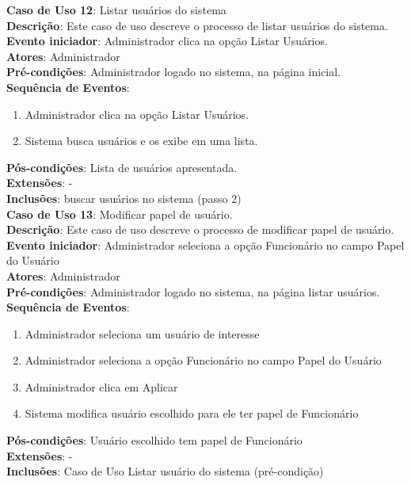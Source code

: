 \documentclass[]{politex}
\begin{document}
\noindent \textbf{Caso de Uso 12}: Listar usuários do sistema \\
\textbf{Descrição}: Este caso de uso descreve o processo de listar usuários do
sistema. \\
\textbf{Evento iniciador}: Administrador clica na opção Listar Usuários. \\
\textbf{Atores}: Administrador \\
\textbf{Pré-condições}: Administrador logado no sistema, na página inicial. \\
\textbf{Sequência de Eventos}:
\begin{enumerate}
\item Administrador clica na opção Listar Usuários.
\item Sistema busca usuários e os exibe em uma lista.
\end{enumerate}
\textbf{Pós-condições}: Lista de usuários apresentada. \\
\textbf{Extensões}: - \\
\textbf{Inclusões}: buscar usuários no sistema (passo 2) \\

\noindent \textbf{Caso de Uso 13}: Modificar papel de usuário. \\
\textbf{Descrição}: Este caso de uso descreve o processo de modificar papel de
usuário. \\
\textbf{Evento iniciador}: Administrador seleciona a opção Funcionário no campo
Papel do Usuário \\
\textbf{Atores}: Administrador \\
\textbf{Pré-condições}: Administrador logado no sistema, na página listar
usuários. \\
\textbf{Sequência de Eventos}:
\begin{enumerate}
\item Administrador seleciona um usuário de interesse
\item Administrador seleciona a opção Funcionário no campo Papel do Usuário
\item Administrador clica em Aplicar
\item Sistema modifica usuário escolhido para ele ter papel de Funcionário
\end{enumerate}
\textbf{Pós-condições}: Usuário escolhido tem papel de Funcionário \\
\textbf{Extensões}: - \\
\textbf{Inclusões}: Caso de Uso Listar usuário do sistema (pré-condição) \\
\end{document}
